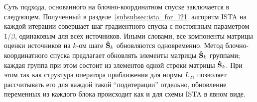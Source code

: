 Суть подхода, основанного на блочно-координатном спуске заключается в следующем.
Полученный в разделе~\ref{subsubsec:ista_for_l21} алгоритм ISTA на каждой
итерации совершает шаг градиентного спуска с постоянным параметром $1/\beta$,
одинаковым для всех источников. Иными словами, все компоненты матрицы 
оценки источников на $k$-ом шаге $\mathbf{\hat{S}}_k$ обновляются одновременно.
Метод блочно-координатного спуска предлагает обновлять элементы матрицы $\mathbf{\hat{S}}_k$
группами; каждая группа при этом состоит из элементов одной строки матрицы $\mathbf{\hat{S}}_k$.
При этом так как структура оператора приближения для нормы $L_{21}$ позволяет
рассчитывать его для каждой такой ``подитерации'' отдельно, обновление переменных из
каждого блока происходит как и для схемы ISTA в явном виде.
